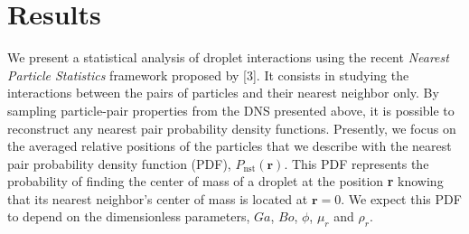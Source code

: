 \documentclass[9pt,a4paper]{article}
\begin{document}
\section{Results}
\setlength{\parindent}{10pt}
\vspace*{-10pt}

We present a statistical analysis of droplet interactions using the recent \textit{Nearest Particle Statistics} framework proposed by [3]. 
It consists in studying the interactions between the pairs of particles and their nearest neighbor only. 
By sampling particle-pair properties from the DNS presented above, it is possible to reconstruct any nearest pair probability density functions. 
Presently, we focus on the averaged relative positions of the particles that we describe with the nearest pair probability density function (PDF), $P_\text{nst}(\textbf{r})$.
This PDF represents the probability of finding the center of mass of a droplet at the position \textbf{r} knowing that its nearest neighbor's center of mass is located at $\textbf{r}=0$. 
We expect this PDF to depend on the dimensionless parameters, $Ga$, $Bo$, $\phi$, $\mu_r$ and $\rho_r$.
\end{document}
